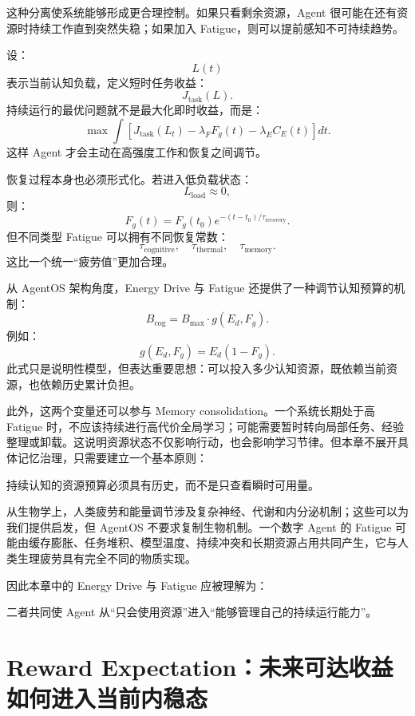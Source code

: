 这种分离使系统能够形成更合理控制。如果只看剩余资源，Agent 很可能在还有资源时持续工作直到突然失稳；如果加入 Fatigue，则可以提前感知不可持续趋势。

设：
\[
L(t)
\]
表示当前认知负载，定义短时任务收益：
\[
J_{\mathrm{task}}(L).
\]
持续运行的最优问题就不是最大化即时收益，而是：
\[
\max
\int
\left[
J_{\mathrm{task}}(L_t)
-
\lambda_FF_g(t)
-
\lambda_EC_E(t)
\right]dt .
\]
这样 Agent 才会主动在高强度工作和恢复之间调节。

恢复过程本身也必须形式化。若进入低负载状态：
\[
L_{\mathrm{load}}\approx0,
\]
则：
\[
F_g(t)
=
F_g(t_0)e^{-(t-t_0)/\tau_{\mathrm{recovery}}}.
\]
但不同类型 Fatigue 可以拥有不同恢复常数：
\[
\tau_{\mathrm{cognitive}},
\quad
\tau_{\mathrm{thermal}},
\quad
\tau_{\mathrm{memory}}.
\]
这比一个统一“疲劳值”更加合理。

从 AgentOS 架构角度，Energy Drive 与 Fatigue 还提供了一种调节认知预算的机制：
\[
B_{\mathrm{cog}}
=
B_{\max}
\cdot
g(E_d,F_g).
\]
例如：
\[
g(E_d,F_g)
=
E_d(1-F_g).
\]
此式只是说明性模型，但表达重要思想：可以投入多少认知资源，既依赖当前资源，也依赖历史累计负担。

此外，这两个变量还可以参与 Memory consolidation。一个系统长期处于高 Fatigue 时，不应该持续进行高代价全局学习；可能需要暂时转向局部任务、经验整理或卸载。这说明资源状态不仅影响行动，也会影响学习节律。但本章不展开具体记忆治理，只需要建立一个基本原则：
\begin{proposition*}
持续认知的资源预算必须具有历史，而不是只查看瞬时可用量。
\end{proposition*}

从生物学上，人类疲劳和能量调节涉及复杂神经、代谢和内分泌机制；这些可以为我们提供启发，但 AgentOS 不要求复制生物机制。一个数字 Agent 的 Fatigue 可能由缓存膨胀、任务堆积、模型温度、持续冲突和长期资源占用共同产生，它与人类生理疲劳具有完全不同的物质实现。

因此本章中的 Energy Drive 与 Fatigue 应被理解为：
\begin{statementbox}
\centering
{}
\end{statementbox}
\begin{statementbox}
\centering
{}
\end{statementbox}
二者共同使 Agent 从“只会使用资源”进入“能够管理自己的持续运行能力”。

\section{Reward Expectation：未来可达收益如何进入当前内稳态}


